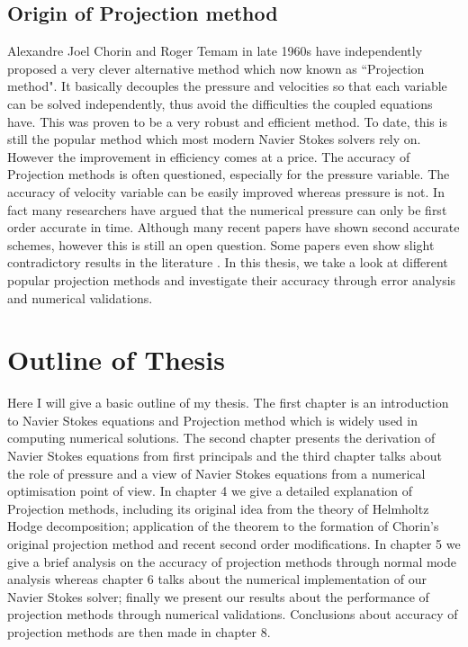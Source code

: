 \subsection{Origin of Projection method}
Alexandre Joel Chorin and Roger Temam in late 1960s have independently proposed a very clever alternative method which now known as ``Projection method". It basically decouples the pressure and velocities so that each variable can be solved independently, thus avoid the difficulties the coupled equations have. This was proven to be a very robust and efficient method. To date, this is still the popular method which most modern Navier Stokes solvers rely on. However the improvement in efficiency comes at a price. The accuracy of Projection methods is often questioned, especially for the pressure variable. The accuracy of velocity variable can be easily improved whereas pressure is not. In fact many researchers have argued that the numerical pressure can only be first order accurate in time. Although many recent papers have shown second accurate schemes, however this is still an open question. Some papers even show slight contradictory results in the literature \cite{brown2001accurate, pyo2005normal,guermond2004error,guermond2006overview}. In this thesis, we take a look at different popular projection methods and investigate their accuracy through error analysis and numerical validations.

\section{Outline of Thesis}
Here I will give a basic outline of my thesis. The first chapter is an introduction to Navier Stokes equations and Projection method which is widely used in computing numerical solutions. The second chapter presents the derivation of Navier Stokes equations from first principals and the third chapter talks about the role of pressure and a view of Navier Stokes equations from a numerical optimisation point of view. In chapter 4 we give a detailed explanation of Projection methods, including its original idea from the theory of Helmholtz Hodge decomposition; application of the theorem to the formation of Chorin's original projection method and recent second order modifications. In chapter 5 we give a brief analysis on the accuracy of projection methods through normal mode analysis whereas chapter 6 talks about the numerical implementation of our Navier Stokes solver; finally we present our results about the performance of projection methods through numerical validations. Conclusions about accuracy of projection methods are then made in chapter 8.
